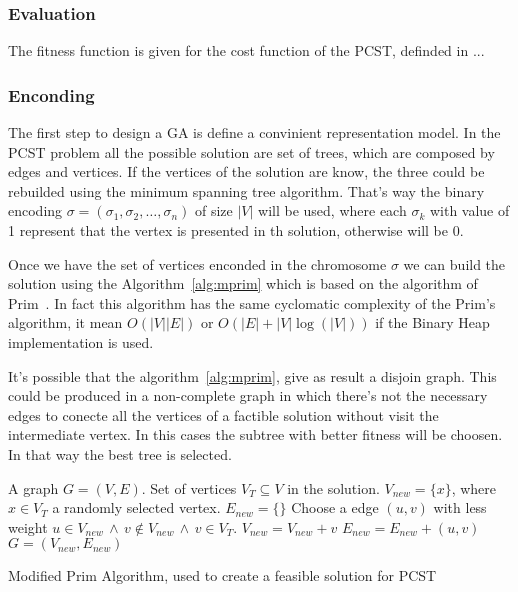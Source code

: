 \documentclass[10pt, conference, compsocconf]{IEEEtran}
\begin{document}
\subsubsection{Evaluation}
The fitness function is given for the cost function of the PCST, definded in ...


\subsubsection{Enconding}
The first step to design a GA is define a convinient representation model. In the PCST problem all the possible solution are set of trees, which are composed by edges and vertices. If the vertices of the solution are know, the three could be rebuilded using the minimum spanning tree algorithm. That's way the binary encoding $\sigma = (\sigma_1, \sigma_2, \ldots, \sigma_n)$ of size $|V|$ will be used, where each $\sigma_k$ with value of 1 represent that the vertex is presented in th solution, otherwise will be 0.

Once we have the set of vertices enconded in the chromosome $\sigma$ we can build the solution using the Algorithm~\ref{alg:mprim} which is based on the algorithm of Prim~\cite{580470}. In fact this algorithm has the same cyclomatic complexity of the Prim's algorithm, it mean $O(|V||E|)$ or $O(|E| + |V| \log(|V |))$ if the Binary Heap~\cite{580470} implementation is used.

It's possible that  the algorithm~\ref{alg:mprim}, give as result a disjoin graph. This could be produced in a non-complete graph in which there's not the necessary edges to conecte all the vertices of a factible solution without visit the intermediate vertex. In this cases the subtree with better fitness will be choosen. In that way the best tree is selected.

\begin{algorithm}
  \begin{algorithmic}
\STATE
\REQUIRE A graph $G = (V,E)$. 
\REQUIRE Set of vertices $V_T \subseteq V$ in the solution.
\STATE $V_{new} = \{x\}$, where $x \in V_T$ a randomly selected vertex.
\STATE $E_{new} = \{\}$
\REPEAT 
\STATE Choose a edge $(u,v)$ with less weight $u \in V_{new}\, \wedge \, v \notin V_{new} \, \wedge \, v \in V_T $. 
\STATE $V_{new} = V_{new}  + v$
\STATE $E_{new} = E_{new} + (u,v)$
\STATE
\RETURN $G = (V_{new}, E_{new})$
\end{algorithmic}
\caption{Modified Prim Algorithm, used to create a feasible solution for PCST}
  \label{alg:mprim}
  
\end{algorithm}
\end{document}
